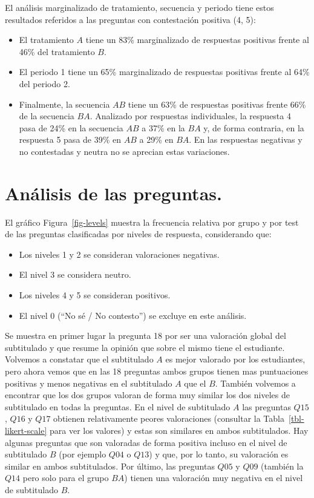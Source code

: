 \documentclass[
  12pt,
  a4paper,
  extrafontsizes,
  onecolumn,
  openright]{memoir}
\providecommand{\tightlist}{%
  \setlength{\itemsep}{0pt}\setlength{\parskip}{0pt}}\usepackage{longtable,booktabs,array}
\begin{document}
El análisis marginalizado de tratamiento, secuencia y periodo tiene
estos resultados referidos a las preguntas con contestación positiva (4,
5):

\begin{itemize}
\item
  El tratamiento \(A\) tiene un 83\% marginalizado de respuestas
  positivas frente al 46\% del tratamiento \(B\).
\item
  El periodo 1 tiene un 65\% marginalizado de respuestas positivas
  frente al 64\% del periodo 2.
\item
  Finalmente, la secuencia \(AB\) tiene un 63\% de respuestas positivas
  frente 66\% de la secuencia \(BA\). Analizado por respuestas
  individuales, la respuesta 4 pasa de 24\% en la secuencia \(AB\) a
  37\% en la \(BA\) y, de forma contraria, en la respuesta 5 pasa de
  39\% en \(AB\) a 29\% en \(BA\). En las respuestas negativas y no
  contestadas y neutra no se aprecian estas variaciones.
\end{itemize}

\hypertarget{anuxe1lisis-de-las-preguntas.}{%
\section{Análisis de las
preguntas.}\label{anuxe1lisis-de-las-preguntas.}}

El gráfico Figura~\ref{fig-levels} muestra la frecuencia relativa por
grupo y por test de las preguntas clasificadas por niveles de respuesta,
considerando que:

\begin{itemize}
\tightlist
\item
  Los niveles 1 y 2 se consideran valoraciones negativas.
\item
  El nivel 3 se considera neutro.
\item
  Los niveles 4 y 5 se consideran positivos.
\item
  El nivel 0 (\enquote{No sé / No contesto}) se excluye en este
  análisis.
\end{itemize}

Se muestra en primer lugar la pregunta 18 por ser una valoración global
del subtitulado y que resume la opinión que sobre el mismo tiene el
estudiante. Volvemos a constatar que el subtitulado \(A\) es mejor
valorado por los estudiantes, pero ahora vemos que en las 18 preguntas
ambos grupos tienen mas puntuaciones positivas y menos negativas en el
subtitulado \(A\) que el \(B\). También volvemos a encontrar que los dos
grupos valoran de forma muy similar los dos niveles de subtitulado en
todas la preguntas. En el nivel de subtitulado \(A\) las preguntas
\(Q15\), \(Q16\) y \(Q17\) obtienen relativamente peores valoraciones
(consultar la Tabla~\ref{tbl-likert-scale} para ver los valores) y estas
son similares en ambos subtitulados. Hay algunas preguntas que son
valoradas de forma positiva incluso en el nivel de subtitulado \(B\)
(por ejemplo \(Q04\) o \(Q13\)) y que, por lo tanto, su valoración es
similar en ambos subtitulados. Por último, las preguntas \(Q05\) y
\(Q09\) (también la \(Q14\) pero solo para el grupo \(BA\)) tienen una
valoración muy negativa en el nivel de subtitulado \(B\).
\end{document}
